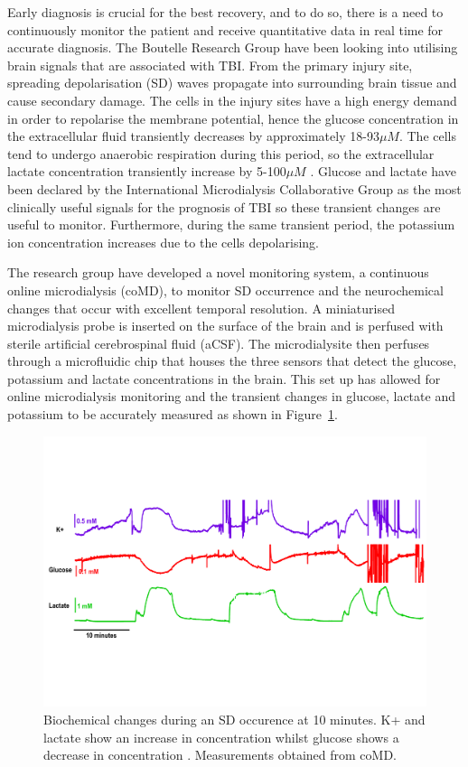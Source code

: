 Early diagnosis is crucial for the best recovery, and to do so, there is a need to continuously monitor the patient and receive quantitative data in real time for accurate diagnosis. The Boutelle Research Group have been looking into utilising brain signals that are associated with TBI. From the primary injury site, spreading depolarisation (SD) waves propagate into surrounding brain tissue and cause secondary damage. The cells in the injury sites have a high energy demand in order to repolarise the membrane potential, hence the glucose concentration in the extracellular fluid transiently decreases by approximately 18-93$\mu M$. The cells tend to undergo anaerobic respiration during this period, so the extracellular lactate concentration transiently increase by 5-100$\mu M$ \cite{D.2010}. Glucose and lactate have been declared by the International Microdialysis Collaborative Group as the most clinically useful signals for the prognosis of TBI \cite{Hutchinson2015} so these transient changes are useful to monitor. Furthermore, during the same transient period, the potassium ion concentration increases \cite{Rogers:2011:10.1039/c0cp02810j} due to the cells depolarising.

The research group have developed a novel monitoring system, a continuous online microdialysis (coMD), to monitor SD occurrence and the neurochemical changes that occur with excellent temporal resolution. A miniaturised microdialysis probe is inserted on the surface of the brain and is perfused with sterile artificial cerebrospinal fluid (aCSF). The microdialysite then perfuses through a microfluidic chip that houses the three sensors that detect the glucose, potassium and lactate concentrations in the brain. This set up has allowed for online microdialysis monitoring and the transient changes in glucose, lactate and potassium to be accurately measured \cite{Rogers2017} as shown in Figure~\ref{fig: SD}.

\begin{figure}[t]
\centering
\includegraphics[trim={0cm 5cm 0.5cm  5cm}, clip, width=1\textwidth]{./figures/conc.pdf}
\captionsetup{justification=centering}
\caption{Biochemical changes during an SD occurence at 10 minutes. K+ and lactate show an increase in concentration whilst glucose shows a decrease in concentration \cite{Rogers2017}. Measurements obtained from coMD.}
\label{fig: SD}
\end{figure}

